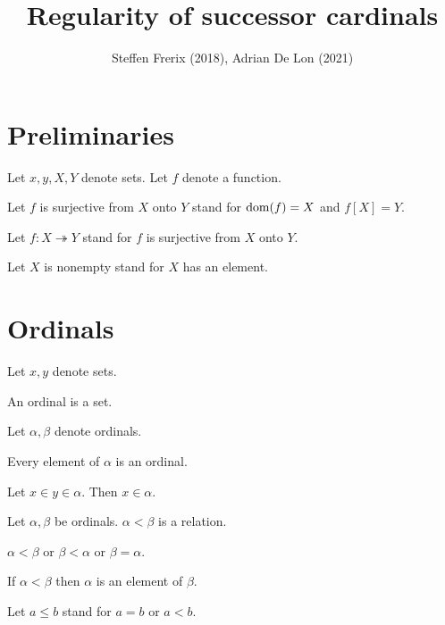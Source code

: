 \documentclass{article}
\title{Regularity of successor cardinals}
\author{Steffen Frerix (2018), Adrian De Lon (2021)}
\date{}
\newcommand{\surjects}{\twoheadrightarrow}
\begin{document}
  \maketitle


  \section{Preliminaries}

  \begin{forthel}

    Let $x, y, X, Y$ denote sets.
    Let $f$ denote a function.

    Let $f$ is surjective from $X$ onto $Y$ stand for $\operatorname{dom}(f) = X$ and $f[X] = Y$.

    Let $f : X \surjects Y$ stand for $f$ is surjective from $X$ onto $Y$.

    Let $X$ is nonempty stand for $X$ has an element.
  \end{forthel}


  \section{Ordinals}

  \begin{forthel}
    Let $x, y$ denote sets.

    \begin{signature}
      An ordinal is a set.
    \end{signature}

    Let $\alpha, \beta$ denote ordinals.

    \begin{axiom}
      Every element of $\alpha$ is an ordinal.
    \end{axiom}

    \begin{axiom}\label{Transitivity}
      Let $x \in y \in \alpha$.
      Then $x \in \alpha$.
    \end{axiom}

    \begin{signature}
      Let $\alpha, \beta$ be ordinals.
      $\alpha < \beta$ is a relation.
    \end{signature}

    \begin{axiom}
      $\alpha < \beta$ or $\beta < \alpha$ or $\beta = \alpha$.
    \end{axiom}

    \begin{axiom}
      If $\alpha < \beta$ then $\alpha$ is an element of $\beta$.
    \end{axiom}

    Let $a \leq b$ stand for $a = b$ or $a < b$.
  \end{forthel}
\end{document}
